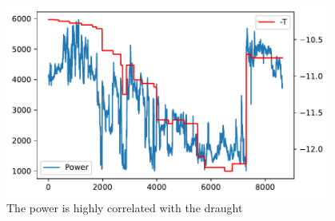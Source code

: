 \begin{figure}[H]
\begin{center}\includegraphics[width = 0.95\textwidth]{figures/power_draught.pdf}\end{center}
\vspace{-0.7cm}
\caption{The power is highly correlated with the draught}
\label{fig:power_draught}
\end{figure}
